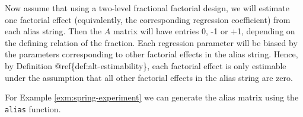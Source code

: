 \documentclass[
]{book}
\newenvironment{Shaded}{\begin{snugshade}}{\end{snugshade}}
\newcommand{\FunctionTok}[1]{\textcolor[rgb]{0.00,0.00,0.00}{#1}}
\newcommand{\NormalTok}[1]{#1}
\newcommand{\SpecialCharTok}[1]{\textcolor[rgb]{0.00,0.00,0.00}{#1}}
\theoremstyle{definition}
\theoremstyle{definition}
\theoremstyle{definition}
\theoremstyle{definition}
\theoremstyle{remark}
\begin{document}
Now assume that using a two-level fractional factorial design, we will estimate one factorial effect (equivalently, the corresponding regression coefficient) from each alias string. Then the \(A\) matrix will have entries 0, -1 or +1, depending on the defining relation of the fraction. Each regression parameter will be biased by the parameters corresponding to other factorial effects in the alias string. Hence, by Definition @ref\{def:alt-estimability\}, each factorial effect is only estimable under the assumption that all other factorial effects in the alias string are zero.

For Example \ref{exm:spring-experiment} we can generate the alias matrix using the \texttt{alias} function.

\begin{Shaded}
\end{Shaded}
\end{document}
